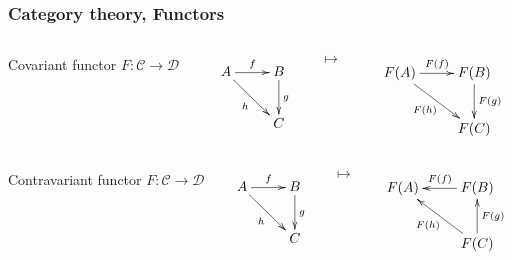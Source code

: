 \documentclass[10pt,handout]{beamer}
\newcommand{\cat}[1]{\mathscr{#1}}
\newcommand{\C}{\cat{C}}
\newcommand{\D}{\cat{D}}
\newcommand{\ra}{\rightarrow}
\begin{document}
\begin{frame}
  \frametitle{Category theory, Functors}
  
  \begin{columns}
    \begin{column}{0.3\textwidth}
      Covariant functor $F:\C\ra\D$
    \end{column}

    \begin{column}{0.25\textwidth}
      \begin{equation*}
        \xymatrix{
          A \ar[r]^f \ar[dr]_{h} & B \ar[d]^g \\
          & C
        }
      \end{equation*}
    \end{column}
    \begin{column}{0.05\textwidth}
      $\mapsto$
    \end{column}
    \begin{column}{0.35\textwidth}
      \begin{equation*}
        \xymatrix{
          F(A) \ar[r]^{F(f)} \ar[dr]_{F(h)} & F(B) \ar[d]^{F(g)} \\
          & F(C)
        }    
      \end{equation*}
    \end{column}
  \end{columns}

  \begin{columns}
    \begin{column}{0.3\textwidth}
      Contravariant functor $F:\C\ra\D$
    \end{column}

    \begin{column}{0.25\textwidth}
      \begin{equation*}
        \xymatrix{
          A \ar[r]^f \ar[dr]_{h} & B \ar[d]^g \\
          & C
        }
      \end{equation*}
    \end{column}
    \begin{column}{0.05\textwidth}
      $\mapsto$
    \end{column}
    \begin{column}{0.35\textwidth}
      \begin{equation*}
        \xymatrix{
          F(A) & F(B) \ar[l]_{F(f)} \\
          & F(C) \ar[u]_{F(g)} \ar[ul]^{F(h)}
        }    
      \end{equation*}
    \end{column}
  \end{columns}


\end{frame}
\end{document}
